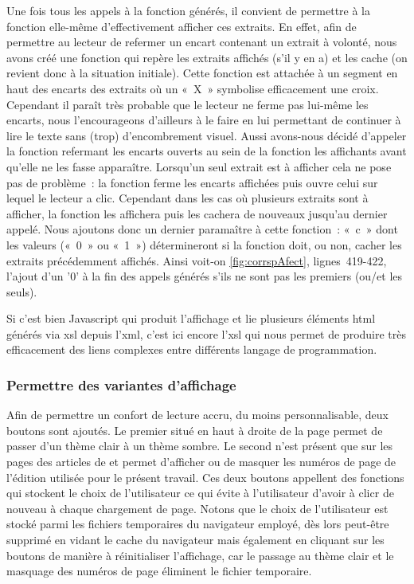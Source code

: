 \documentclass[12pt, a4paper]{article}
\begin{document}

Une fois tous les appels à la fonction générés, il convient de permettre à la fonction elle-même d'effectivement afficher ces extraits. En effet, afin de permettre au lecteur de refermer un encart contenant un extrait à volonté, nous avons créé une fonction qui repère les extraits affichés (s'il y en a) et les cache (on revient donc à la situation initiale). Cette fonction est attachée à un segment en haut des encarts des extraits où un «~X~» symbolise efficacement une croix.
Cependant il paraît très probable que le lecteur ne ferme pas lui-même les encarts, nous l'encourageons d'ailleurs à le faire en lui permettant de continuer à lire le texte sans (trop) d'encombrement visuel. Aussi avons-nous décidé d'appeler la fonction refermant les encarts ouverts au sein de la fonction les affichants avant qu'elle ne les fasse apparaître.
Lorsqu'un seul extrait est à afficher cela ne pose pas de problème~: la fonction ferme les encarts affichées puis ouvre celui sur lequel le lecteur a clic. Cependant dans les cas où plusieurs extraits sont à afficher, la fonction les affichera puis les cachera de nouveaux jusqu'au dernier appelé. Nous ajoutons donc un dernier paramaître à cette fonction~: «~c~» dont les valeurs («~0~» ou «~1~») détermineront si la fonction doit, ou non, cacher les extraits précédemment affichés. 
Ainsi voit-on \ref{fig:corrspAfect}, lignes~419-422, l'ajout d'un '0' à la fin des appels générés s'ils ne sont pas les premiers (ou/et les seuls).


Si c'est bien Javascript qui produit l'affichage et lie plusieurs éléments html générés via xsl depuis l'xml, c'est ici encore l'xsl qui nous permet de produire très efficacement des liens complexes entre différents langage de programmation.

\subsubsection{Permettre des variantes d'affichage}

Afin de permettre un confort de lecture accru, du moins personnalisable, deux boutons sont ajoutés. Le premier situé en haut à droite de la page permet de passer d'un thème clair à un thème sombre. Le second n'est présent que sur les pages des articles de \punr{} et permet d'afficher ou de masquer les numéros de page de l'édition utilisée pour le présent travail. Ces deux boutons appellent des fonctions qui stockent le choix de l'utilisateur ce qui évite à l'utilisateur d'avoir à clicr de nouveau à chaque chargement de page. Notons que le choix de l'utilisateur est stocké parmi les fichiers temporaires du navigateur employé, dès lors peut-être supprimé en vidant le cache du navigateur mais également en cliquant sur les boutons de manière à réinitialiser l'affichage, car le passage au thème clair et le masquage des numéros de page éliminent le fichier temporaire.
\end{document}
